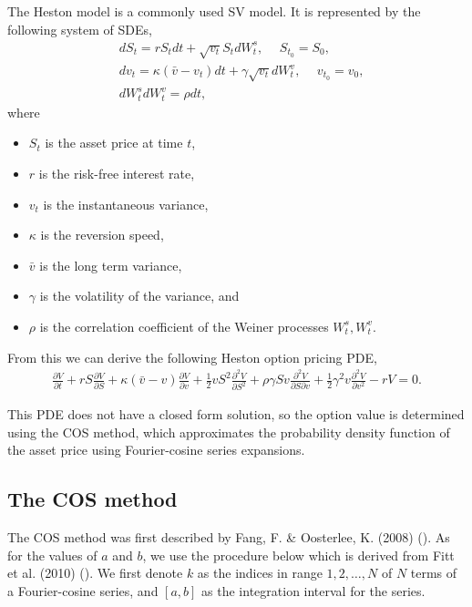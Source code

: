 \documentclass[12pt,a4paper]{article}
\begin{document}
The Heston model is a commonly used SV model. It is represented by the following system of SDEs,
\begin{align}
    &dS_t = rS_tdt + \sqrt{v_t}S_tdW_t^s, \hspace{15pt} S_{t_0}=S_0, \nonumber \\
    &dv_t = \kappa(\bar{v}-v_t)dt + \gamma\sqrt{v_t}dW_t^v, \hspace{15pt} v_{t_0}=v_0, \\
    &dW_t^sdW_t^v = \rho dt, \nonumber
\end{align}
where
\begin{itemize}
    \item $S_t$ is the asset price at time $t$,
    \item $r$ is the risk-free interest rate,
    \item $v_t$ is the instantaneous variance,
    \item $\kappa$ is the reversion speed,
    \item $\bar{v}$ is the long term variance,
    \item $\gamma$ is the volatility of the variance, and
    \item $\rho $ is the correlation coefficient of the Weiner processes $W_t^s, W_t^v$.
\end{itemize}

From this we can derive the following Heston option pricing PDE,
\begin{align}
    \frac{\partial V}{\partial t} + rS\frac{\partial V}{\partial S} + \kappa(\bar{v}-v)\frac{\partial V}{\partial v} + \frac{1}{2}vS^2\frac{\partial^2V}{\partial S^2} + \rho\gamma Sv\frac{\partial^2V}{\partial S\partial v} + \frac{1}{2}\gamma^2v\frac{\partial^2 V}{\partial v^2} -rV = 0.
\end{align}

This PDE does not have a closed form solution, so the option value is determined using the COS method, which approximates the probability density function of the asset price using Fourier-cosine series expansions. 

\subsection{The COS method}

The COS method was first described by Fang, F. \& Oosterlee, K. (2008) (\cite{hestonfo}). As for the values of $a$ and $b$, we use the procedure below which is derived from Fitt et al. (2010) (\cite{fitt_wilson_ockendon_norbury_2010}). We first denote $k$ as the indices in range $1,2,\dots,N$ of $N$ terms of a Fourier-cosine series, and $[a, b]$ as the integration interval for the series.
\end{document}
